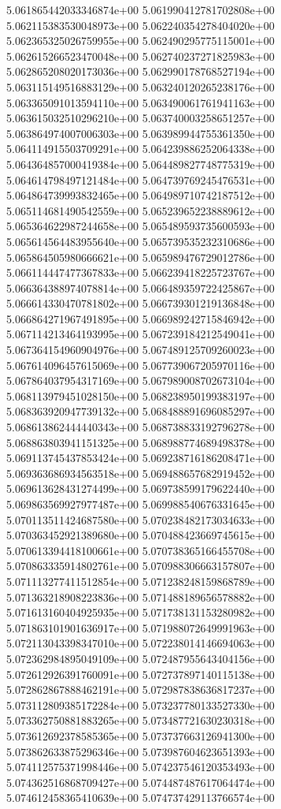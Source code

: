 5.061865442033346874e+00
5.061990412781702808e+00
5.062115383530048973e+00
5.062240354278404020e+00
5.062365325026759955e+00
5.062490295775115001e+00
5.062615266523470048e+00
5.062740237271825983e+00
5.062865208020173036e+00
5.062990178768527194e+00
5.063115149516883129e+00
5.063240120265238176e+00
5.063365091013594110e+00
5.063490061761941163e+00
5.063615032510296210e+00
5.063740003258651257e+00
5.063864974007006303e+00
5.063989944755361350e+00
5.064114915503709291e+00
5.064239886252064338e+00
5.064364857000419384e+00
5.064489827748775319e+00
5.064614798497121484e+00
5.064739769245476531e+00
5.064864739993832465e+00
5.064989710742187512e+00
5.065114681490542559e+00
5.065239652238889612e+00
5.065364622987244658e+00
5.065489593735600593e+00
5.065614564483955640e+00
5.065739535232310686e+00
5.065864505980666621e+00
5.065989476729012786e+00
5.066114447477367833e+00
5.066239418225723767e+00
5.066364388974078814e+00
5.066489359722425867e+00
5.066614330470781802e+00
5.066739301219136848e+00
5.066864271967491895e+00
5.066989242715846942e+00
5.067114213464193995e+00
5.067239184212549041e+00
5.067364154960904976e+00
5.067489125709260023e+00
5.067614096457615069e+00
5.067739067205970116e+00
5.067864037954317169e+00
5.067989008702673104e+00
5.068113979451028150e+00
5.068238950199383197e+00
5.068363920947739132e+00
5.068488891696085297e+00
5.068613862444440343e+00
5.068738833192796278e+00
5.068863803941151325e+00
5.068988774689498378e+00
5.069113745437853424e+00
5.069238716186208471e+00
5.069363686934563518e+00
5.069488657682919452e+00
5.069613628431274499e+00
5.069738599179622440e+00
5.069863569927977487e+00
5.069988540676331645e+00
5.070113511424687580e+00
5.070238482173034633e+00
5.070363452921389680e+00
5.070488423669745615e+00
5.070613394418100661e+00
5.070738365166455708e+00
5.070863335914802761e+00
5.070988306663157807e+00
5.071113277411512854e+00
5.071238248159868789e+00
5.071363218908223836e+00
5.071488189656578882e+00
5.071613160404925935e+00
5.071738131153280982e+00
5.071863101901636917e+00
5.071988072649991963e+00
5.072113043398347010e+00
5.072238014146694063e+00
5.072362984895049109e+00
5.072487955643404156e+00
5.072612926391760091e+00
5.072737897140115138e+00
5.072862867888462191e+00
5.072987838636817237e+00
5.073112809385172284e+00
5.073237780133527330e+00
5.073362750881883265e+00
5.073487721630230318e+00
5.073612692378585365e+00
5.073737663126941300e+00
5.073862633875296346e+00
5.073987604623651393e+00
5.074112575371998446e+00
5.074237546120353493e+00
5.074362516868709427e+00
5.074487487617064474e+00
5.074612458365410639e+00
5.074737429113766574e+00
